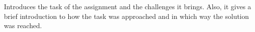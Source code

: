 Introduces the task of the assignment and the challenges it
brings.
Also, it gives a brief introduction to how the task was approached and in which way the solution was reached.
